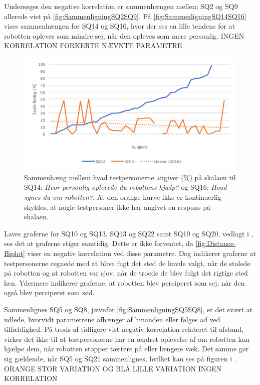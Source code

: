\noindent
%
Undersøges den negative korrelation er sammenhængen mellem SQ2 og SQ9 allerede vist på \autoref{fig:SammenligningSQ2SQ9}. På \autoref{fig:SammenligningSQ14SQ16} vises sammenhængen for SQ14 og SQ16, hvor der ses en lille tendens for at robotten opleves som mindre sej, når den opleves som mere personlig. INGEN KORRELATION FORKERTE NÆVNTE PARAMETRE
%
\begin{figure}[H]
	\centering
	\includegraphics[width=\textwidth]{Figure/Korrelationsgrafer/SQ14+SQ16}
	\caption{Sammenhæng mellem hvad testpersonerne angiver (\%) på skalaen til SQ14: \textit{Hvor personlig oplevede du robottens hjælp?} og SQ16: \textit{Hvad synes du om robotten?}. At den orange kurve ikke er kontinuerlig skyldes, at nogle testpersoner ikke har angivet en respons på skalaen.}
	\label{fig:SammenligningSQ14SQ16}
\end{figure}
\noindent
%
Laves graferne for SQ10 og SQ13, SQ13 og SQ22 samt SQ19 og SQ20, vedlagt i , ses det at graferne stiger samtidig. Dette er ikke forventet, da \autoref{fig:Distance-Biplot} viser en negativ korrelation ved disse parametre. Dog indikerer graferne at testpersonerne regnede med at blive fugt det sted de havde valgt, når de stolede på robotten og at robotten var sjov, når de troede de blev fulgt det rigtige sted hen. Ydermere indikerer graferne, at robotten blev perciperet som sej, når den også blev perciperet som sød.

Sammenlignes SQ5 og SQ8, jævnfør \autoref{fig:SammenligningSQ5SQ8}, er det svært at udlede, hvorvidt parametrene afhænger af hinanden eller følges ad ved tilfældighed. På trods af tidligere vist negativ korrelation relateret til afstand, virker det ikke til at testpersonerne har en ændret oplevelse af om robotten kan hjælpe dem, når robotten stopper tættere på eller længere væk. Det samme gør sig gældende, når SQ5 og SQ21 sammenlignes, hvilket kan ses på figuren i . ORANGE STOR VARIATION OG BLÅ LILLE VARIATION  INGEN KORRELATION


